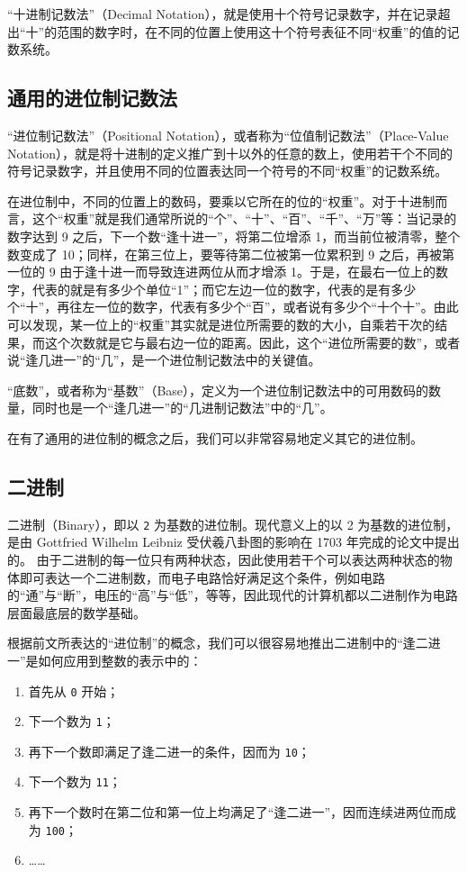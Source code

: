         “十进制记数法”（Decimal Notation），就是使用十个符号记录数字，并在记录超出“十”的范围的数字时，在不同的位置上使用这十个符号表征不同“权重”的值的记数系统。

    \subsection{通用的进位制记数法}\label{subsec:NumberSystemBasics/PositionalNotation/Common}
        “进位制记数法”（Positional Notation），或者称为“位值制记数法”（Place-Value Notation），就是将十进制的定义推广到十以外的任意的数上，使用若干个不同的符号记录数字，并且使用不同的位置表达同一个符号的不同“权重”的记数系统。

        在进位制中，不同的位置上的数码，要乘以它所在的位的“权重”。对于十进制而言，这个“权重”就是我们通常所说的“个”、“十”、“百”、“千”、“万”等：当记录的数字达到 9 之后，下一个数“逢十进一”，将第二位增添 1，而当前位被清零，整个数变成了 10；同样，在第三位上，要等待第二位被第一位累积到 9 之后，再被第一位的 9 由于逢十进一而导致连进两位从而才增添 1。于是，在最右一位上的数字，代表的就是有多少个单位“1”；而它左边一位的数字，代表的是有多少个“十”，再往左一位的数字，代表有多少个“百”，或者说有多少个“十个十”。由此可以发现，某一位上的“权重”其实就是进位所需要的数的大小，自乘若干次的结果，而这个次数就是它与最右边一位的距离。因此，这个“进位所需要的数”，或者说“逢几进一”的“几”，是一个进位制记数法中的关键值。

        “底数”，或者称为“基数”（Base），定义为一个进位制记数法中的可用数码的数量，同时也是一个“逢几进一”的“几进制记数法”中的“几”。

        在有了通用的进位制的概念之后，我们可以非常容易地定义其它的进位制。

    \subsection{二进制}\label{subsec:NumberSystemBasics/PositionalNotation/Binary}
        二进制（Binary），即以 \texttt{2} 为基数的进位制。现代意义上的以 2 为基数的进位制，是由 Gottfried Wilhelm Leibniz 受伏羲八卦图的影响在 1703 年完成的论文\cite{gwleibniz}中提出的。
        由于二进制的每一位只有两种状态，因此使用若干个可以表达两种状态的物体即可表达一个二进制数，而电子电路恰好满足这个条件，例如电路的“通”与“断”，电压的“高”与“低”，等等，因此现代的计算机都以二进制作为电路层面最底层的数学基础。

        根据前文所表达的“进位制”的概念，我们可以很容易地推出二进制中的“逢二进一”是如何应用到整数的表示中的：
        \begin{enumerate}[start = 0]
            \item 首先从 \texttt{0} 开始；
            \item 下一个数为 \texttt{1}；
            \item 再下一个数即满足了逢二进一的条件，因而为 \texttt{10}；
            \item 下一个数为 \texttt{11}；
            \item 再下一个数时在第二位和第一位上均满足了“逢二进一”，因而连续进两位而成为 \texttt{100}；
            \item ……
        \end{enumerate}

